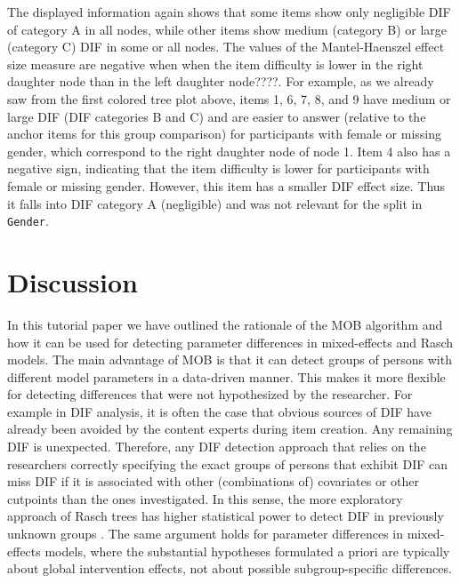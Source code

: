 \documentclass[doc,floatsintext,natbib]{apa7}
\begin{document}
The displayed information again shows that some items show only negligible DIF of category A in all nodes, while other items show medium (category B) or large (category C) DIF in some or all nodes. The values of the Mantel-Haenszel effect size measure are negative when  when the item difficulty is lower in the right daughter node than in the left daughter node????. For example, as we already saw from the first colored tree plot above, items 1, 6, 7, 8, and 9 have medium or large DIF (DIF categories B and C) and are  easier to answer (relative to the anchor items for this group comparison) for participants with female or missing gender, which correspond to the right daughter node of node 1. Item 4 also has a negative sign, indicating that the item difficulty is lower for participants with female or missing gender. However, this item has a smaller DIF effect size. Thus it falls into DIF category A (negligible) and was not relevant for the split in \texttt{Gender}.


\FloatBarrier
\section{Discussion}

In this tutorial paper we have outlined the rationale of the MOB algorithm and how it can be used for detecting parameter differences in mixed-effects and Rasch models. The main advantage of MOB is that it can detect groups of persons with different model parameters in a data-driven manner. This makes it more flexible for detecting differences that were not hypothesized by the researcher. For example in DIF analysis, it is often the case that obvious sources of DIF have already been avoided by the content experts during item creation. Any remaining DIF is unexpected. Therefore, any DIF detection approach that relies on the researchers correctly specifying the exact groups of persons that exhibit DIF can miss DIF if it is associated with other (combinations of) covariates or other cutpoints than the ones investigated. In this sense, the more exploratory approach of Rasch trees has higher statistical power to detect DIF in previously unknown groups \citep{StrKopZei:2015:P}. The same argument holds for parameter differences in mixed-effects models, where the substantial hypotheses formulated a priori are typically about global intervention effects, not about possible subgroup-specific differences. 
\end{document}
